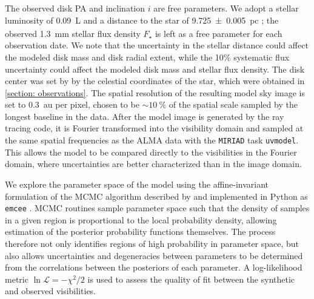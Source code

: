 \documentclass[modern]{aastex62}
\begin{document}
The observed disk PA and inclination $i$ are free parameters.
We adopt a stellar luminosity of \SI{0.09}{L_\sun} \citep{plavchan09} and a distance to the star of \SI{9.725 \pm 0.005}{pc}
\citep{gaia_DR2}; the observed \SI{1.3}{mm} stellar flux density $F_\star$ is left as a free parameter for each observation date.
We note that the uncertainty in the stellar distance could affect the modeled disk mass and disk radial extent, while the 10\% systematic flux uncertainty could affect the modeled disk mass and stellar flux density.
The disk center was set by by the celestial coordinates of the star, which were obtained in \ref{section: observations}.
The spatial resolution of the resulting model sky image is set to \SI{0.3}{au} per pixel, chosen to be $\sim \SI{10}{\percent}$ of the spatial scale sampled by the longest baseline in the data. 
After the model image is generated by the ray tracing code, it is Fourier transformed into the visibility domain and sampled at the same spatial frequencies as the ALMA data with the \texttt{MIRIAD} task \texttt{uvmodel}.
This allows the model to be compared directly to the visibilities in the Fourier domain, where uncertainties are better characterized than in the image domain.

We explore the parameter space of the model using the affine-invariant formulation of the MCMC algorithm described by \cite{goodmanweare10} and implemented in Python as \texttt{emcee} \citep{foreman-mackey13}.  
MCMC routines sample parameter space such that the density of samples in a given region is proportional to the local probability density, allowing estimation of the posterior probability functions themselves.
The process therefore not only identifies regions of high probability in parameter space, but also allows uncertainties and degeneracies between parameters to be determined from the correlations between the posteriors of each parameter. 
A log-likelihood metric $\ln \mathcal{L} = -\chi^2 / 2$ is used to assess the quality of fit between the synthetic and observed visibilities.
\end{document}
